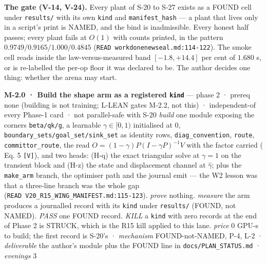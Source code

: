 \documentclass[11pt,a4paper]{article}
\newcounter{none}                 %
\theoremstyle{plain}
\theoremstyle{definition}
\theoremstyle{remark}
\begin{document}
\textbf{The gate (V-14, V-24).} Every plant of S-20 to S-27 exists as a
FOUND cell under \texttt{results/} with its own \texttt{kind} and
\texttt{manifest\_hash} --- a plant that lives only in a script's print
is NAMED, and the bind is inadmissible. Every honest half passes; every
plant fails at \(O(1)\) with counts printed, in the pattern
\(0.9749 / 0.9165 / 1.000 / 0.4845\)
(\texttt{READ\ workdonenewseal.md:114-122}). The smoke cell reads inside
the law-versus-measured band \([-1.8, +14.4]\) per cent of \(1.680\) s,
or is re-labelled the per-op floor it was declared to be. The author
decides one thing: whether the arena may start.

\textbf{M-2.0 · Build the shape arm as a registered \texttt{kind}} ---
phase 2 · prereq none (building is not training; L-LEAN gates M-2.2, not
this) · independent-of every Phase-1 card · not parallel-safe with S-20
\emph{build} one module exposing the corners \texttt{beta/qk/g}, a
learnable \(\gamma\in[0,1)\) initialised at \(0\),
\texttt{boundary\_sets/goal\_set/sink\_set} as identity rows,
\texttt{diag\_convention}, \texttt{route}, \texttt{committor\_route},
the read \(O=(1-\gamma)P(I-\gamma P)^{-1}V\) with the factor carried
(\citep{fagnou-2024-chacal} Eq. 5 \texttt{{[}V{]}}), and two heads:
(H-q) the exact triangular solve at \(\gamma=1\) on the transient block
and (H-z) the state and displacement channel at \(\hat\gamma\); plus the
\texttt{make\_arm} branch, the optimiser path and the journal emit ---
the W2 lesson was that a three-line branch was the whole gap
(\texttt{READ\ V20\_R15\_WING\_MANIFEST.md:115-123}). \emph{prove}
nothing. \emph{measure} the arm produces a journalled record with its
\texttt{kind} under \texttt{results/} (FOUND, not NAMED). \emph{PASS}
one FOUND record. \emph{KILL} a \texttt{kind} with zero records at the
end of Phase 2 is STRUCK, which is the R15 kill applied to this lane.
\emph{price} \(0\) GPU-s to build; the first record is S-20's ·
\emph{mechanism} FOUND-not-NAMED, P-4, L-2 · \emph{deliverable} the
author's module plus the FOUND line in \texttt{docs/PLAN\_STATUS.md} ·
\emph{evenings} 3
\end{document}
